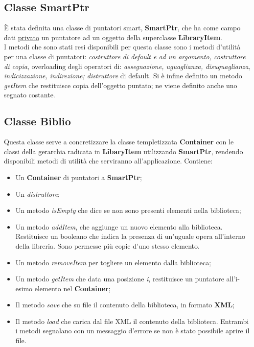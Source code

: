 {		\subsection{Classe SmartPtr}{
			È stata definita una classe di puntatori smart, \textbf{SmartPtr}, che ha come campo dati \underline{privato} un puntatore ad un oggetto della superclasse \textbf{LibraryItem}. \\
			I metodi che sono stati resi disponibili per questa classe sono i metodi d'utilità per una classe di puntatori:
			\textit{costruttore di default e ad un argomento, costruttore di copia}, overloading degli operatori di: \textit{assegnazione, uguaglianza, disuguaglianza, indicizzazione, indirezione; distruttore} di default. Si è infine definito un metodo \textit{getItem} che restituisce copia dell'oggetto puntato; ne viene definito anche uno segnato costante.
		}
		\subsection{Classe Biblio}{
			Questa classe serve a concretizzare la classe templetizzata \textbf{Container} con le classi della gerarchia radicata in \textbf{LibaryItem} utilizzando \textbf{SmartPtr}, rendendo disponibili metodi di utilità che serviranno all'applicazione. Contiene:
			\begin{itemize}\itemsep=0.5pt
				\item Un \textbf{Container} di puntatori a \textbf{SmartPtr};
				\item Un \textit{distruttore};
				\item Un metodo \textit{isEmpty} che dice se non sono presenti elementi nella biblioteca;
				\item Un  metodo \textit{addItem}, che aggiunge un nuovo elemento alla biblioteca. Restituisce un booleano che indica la presenza di un'uguale opera all'interno della libreria. Sono permesse più copie d'uno stesso elemento.
				\item Un metodo \textit{removeItem} per togliere un elemento dalla biblioteca;
				\item Un metodo \textit{getItem} che data una posizione \textit{i}, restituisce un puntatore all'i-esimo elemento nel \textbf{Container};
				\item Il metodo \textit{save} che su file il contenuto della biblioteca, in formato \textbf{XML};
				\item Il metodo \textit{load} che carica dal file XML il contenuto della biblioteca.
					Entrambi i metodi segnalano con un messaggio d'errore se non è stato possibile aprire il file.
			\end{itemize}
		}
	}